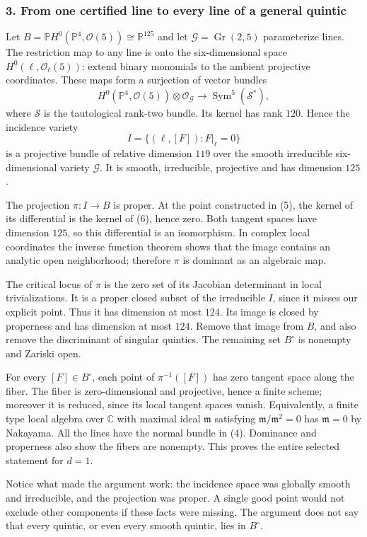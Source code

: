 \documentclass[11pt]{article}
\begin{document}
\subsubsection{3. From one certified line to every line of a general quintic}
Let $B=\mathbb P H^0(\mathbb P^4,\mathcal O(5))\cong\mathbb P^{125}$ and let $\mathcal G=\operatorname{Gr}(2,5)$ parameterize lines. The restriction map to any line is onto the six-dimensional space $H^0(\ell,\mathcal O_\ell(5))$: extend binary monomials to the ambient projective coordinates. These maps form a surjection of vector bundles
\[
 H^0(\mathbb P^4,\mathcal O(5))\otimes\mathcal O_{\mathcal G}
 \longrightarrow \operatorname{Sym}^5(\mathcal S^*),
\]
where $\mathcal S$ is the tautological rank-two bundle. Its kernel has rank $120$. Hence the incidence variety
\[
 I=\{(\ell,[F]):F|_\ell=0\}
\]
is a projective bundle of relative dimension $119$ over the smooth irreducible six-dimensional variety $\mathcal G$. It is smooth, irreducible, projective and has dimension $125$.

The projection $\pi:I\to B$ is proper. At the point constructed in (5), the kernel of its differential is the kernel of (6), hence zero. Both tangent spaces have dimension $125$, so this differential is an isomorphism. In complex local coordinates the inverse function theorem shows that the image contains an analytic open neighborhood; therefore $\pi$ is dominant as an algebraic map.

The critical locus of $\pi$ is the zero set of its Jacobian determinant in local trivializations. It is a proper closed subset of the irreducible $I$, since it misses our explicit point. Thus it has dimension at most $124$. Its image is closed by properness and has dimension at most $124$. Remove that image from $B$, and also remove the discriminant of singular quintics. The remaining set $B^\circ$ is nonempty and Zariski open.

For every $[F]\in B^\circ$, each point of $\pi^{-1}([F])$ has zero tangent space along the fiber. The fiber is zero-dimensional and projective, hence a finite scheme; moreover it is reduced, since its local tangent spaces vanish. Equivalently, a finite type local algebra over $\mathbb C$ with maximal ideal $\mathfrak m$ satisfying $\mathfrak m/\mathfrak m^2=0$ has $\mathfrak m=0$ by Nakayama. All the lines have the normal bundle in (4). Dominance and properness also show the fibers are nonempty. This proves the entire selected statement for $d=1$.

Notice what made the argument work: the incidence space was globally smooth and irreducible, and the projection was proper. A single good point would not exclude other components if these facts were missing. The argument does not say that every quintic, or even every smooth quintic, lies in $B^\circ$.
\end{document}
